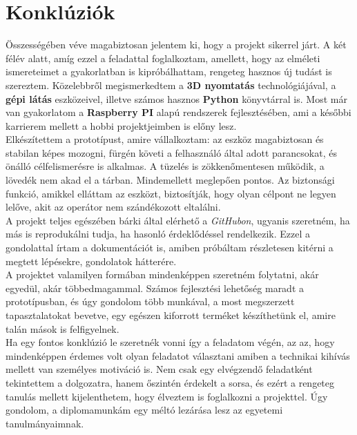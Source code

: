 \chapter{Konklúziók}
Összességében véve magabiztosan jelentem ki, hogy a projekt sikerrel járt. A két félév alatt, amíg ezzel a feladattal foglalkoztam, amellett, hogy az elméleti ismereteimet a gyakorlatban is kipróbálhattam, rengeteg hasznos új tudást is szereztem. Közelebbről megismerkedtem a \textbf{3D nyomtatás} technológiájával, a \textbf{gépi látás} eszközeivel, illetve számos hasznos \textbf{Python} könyvtárral is. Most már van gyakorlatom a \textbf{Raspberry PI} alapú rendszerek fejlesztésében, ami a későbbi karrierem mellett a hobbi projektjeimben is előny lesz.\\

Elkészítettem a prototípust, amire vállalkoztam: az eszköz magabiztosan és stabilan képes mozogni, fürgén követi a felhasználó által adott parancsokat, és önálló célfelismerésre is alkalmas. A tüzelés is zökkenőmentesen működik, a lövedék nem akad el a tárban. Mindemellett meglepően pontos. Az biztonsági funkció, amikkel elláttam az eszközt, biztosítják, hogy olyan célpont ne legyen lelőve, akit az operátor nem szándékozott eltalálni. \\

A projekt teljes egészében bárki által elérhető a \textsl{GitHubon}, ugyanis szeretném, ha más is reprodukálni tudja, ha hasonló érdeklődéssel rendelkezik. Ezzel a gondolattal írtam a dokumentációt is, amiben próbáltam részletesen kitérni a megtett lépésekre, gondolatok hátterére.\\

A projektet valamilyen formában mindenképpen szeretném folytatni, akár egyedül, akár többedmagammal. Számos fejlesztési lehetőség maradt a prototípusban, és úgy gondolom több munkával, a most megszerzett tapasztalatokat bevetve, egy egészen kiforrott terméket készíthetünk el, amire talán mások is felfigyelnek.\\

Ha egy fontos konklúzió le szeretnék vonni így a feladatom végén, az az, hogy mindenképpen érdemes volt olyan feladatot választani amiben a technikai kihívás mellett van személyes motiváció is. Nem csak egy elvégzendő feladatként tekintettem a dolgozatra, hanem őszintén érdekelt a sorsa, és ezért a rengeteg tanulás mellett kijelenthetem, hogy élveztem is foglalkozni a projekttel. Úgy gondolom, a diplomamunkám egy méltó lezárása lesz az egyetemi tanulmányaimnak. 
